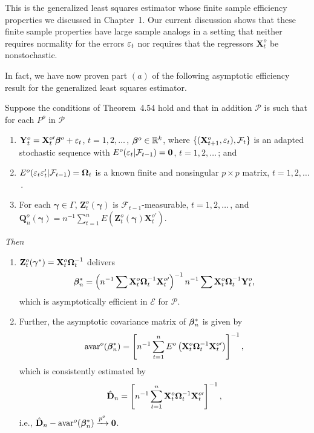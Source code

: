 This is the generalized least squares estimator whose finite sample efficiency properties we discussed in Chapter~1. Our current discussion shows
that these finite sample properties have large sample analogs in a setting
that neither requires normality for the errors $\varepsilon_t$ nor requires that the regressors $\mathbf{X}_t^o$ be nonstochastic.

In fact, we have now proven part $(a)$ of the following asymptotic efficiency
result for the generalized least squares estimator.

\begin{theorem}\label{thm:4.57}
Suppose the conditions of Theorem~4.54 hold and that in addition $\mathcal{P}$ is such that for each $P^o$ in $\mathcal{P}$
\begin{enumerate}[label=(\roman*)]
\item $\mathbf{Y}_t^o = \mathbf{X}_t^{o\prime}\boldsymbol{\beta}^o + \varepsilon_t$, \quad $t = 1, 2, \ldots$\,, $\boldsymbol{\beta}^o \in \mathbb{R}^k$,
where $\{(\mathbf{X}_{t+1}^o, \varepsilon_t), \mathcal{F}_t\}$ is an adapted stochastic sequence with $E^o(\varepsilon_t|
\mathcal{F}_{t-1}) = \mathbf{0}$, $t = 1, 2, \ldots$\,; and
\item $E^o(\varepsilon_t\varepsilon_t'|\mathcal{F}_{t-1}) = \boldsymbol{\Omega}_t$ is a known finite and nonsingular $p \times p$ matrix, $t = 1, 2, \ldots$\,.
\item For each $\boldsymbol{\gamma} \in \Gamma$, $\mathbf{Z}_t^o(\boldsymbol{\gamma})$ is $\mathcal{F}_{t-1}$-measurable, $t = 1, 2, \ldots$\,, and $\mathbf{Q}_n^o(\boldsymbol{\gamma}) = n^{-1}\sum_{t=1}^{n}E(\mathbf{Z}_t^o(\boldsymbol{\gamma})\mathbf{X}_t^{o\prime})$.
\end{enumerate}

\emph{Then}
\begin{enumerate}[label=(\alph*)]
\item $\mathbf{Z}_t^o(\boldsymbol{\gamma}^*) = \mathbf{X}_t^o\boldsymbol{\Omega}_t^{-1}$ delivers
\[
\boldsymbol{\beta}_n^* = \left(n^{-1}\sum \mathbf{X}_t^o\boldsymbol{\Omega}_t^{-1}\mathbf{X}_t^{o\prime}\right)^{-1}n^{-1}\sum \mathbf{X}_t^o\boldsymbol{\Omega}_t^{-1}\mathbf{Y}_t^o,
\]
which is asymptotically efficient in $\mathcal{E}$ for $\mathcal{P}$.
\item Further, the asymptotic covariance matrix of $\boldsymbol{\beta}_n^*$ is given by
\[
\mathrm{avar}^o(\boldsymbol{\beta}_n^*) = \left[n^{-1}\sum_{t=1}^{n}E^o\left(\mathbf{X}_t^o\boldsymbol{\Omega}_t^{-1}\mathbf{X}_t^{o\prime}\right)\right]^{-1},
\]
which is consistently estimated by
\[
\hat{\mathbf{D}}_n = \left[n^{-1}\sum_{t=1}^{n}\mathbf{X}_t^o\boldsymbol{\Omega}_t^{-1}\mathbf{X}_t^{o\prime}\right]^{-1},
\]
i.e., $\hat{\mathbf{D}}_n - \mathrm{avar}^o(\boldsymbol{\beta}_n^*) \xrightarrow{p^o} \mathbf{0}$.
\end{enumerate}
\end{theorem}

